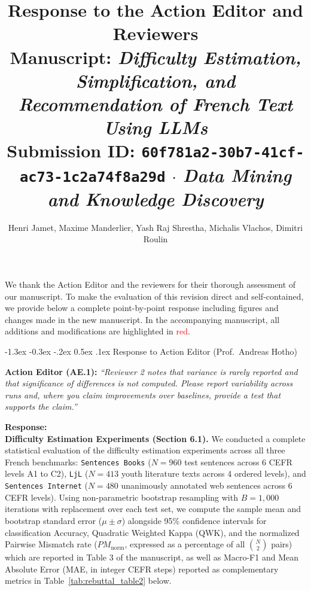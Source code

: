 \documentclass[11pt,a4paper]{article}
\title{\vspace{-1.2cm}\textbf{\large Response to the Action Editor and Reviewers}\\[0.2em]
\normalsize Manuscript: \textit{Difficulty Estimation, Simplification, and Recommendation of French Text Using LLMs}\\
\small Submission ID: \texttt{60f781a2-30b7-41cf-ac73-1c2a74f8a29d} $\cdot$ \textit{Data Mining and Knowledge Discovery}}
\author{\small Henri Jamet, Maxime Manderlier, Yash Raj Shrestha, Michalis Vlachos, Dimitri Roulin}
\date{\vspace{-0.8cm}}
\makeatletter
\renewcommand\section{\@startsection {section}{1}{\z@}%
  {-1.3ex \@plus -0.3ex \@minus -.2ex}%
  {0.5ex \@plus.1ex}%
  {\normalfont\large\bfseries}}
\makeatother
\begin{document}
\maketitle

\medskip
\noindent
We thank the Action Editor and the reviewers for their thorough assessment of our manuscript. To make the evaluation of this revision direct and self-contained, we provide below a complete point-by-point response including figures and changes made in the new manuscript. In the accompanying manuscript, all additions and modifications are highlighted in \textcolor{red}{red}.

\section{Response to Action Editor (Prof.\ Andreas Hotho)}

\begin{reviewbox}
\textbf{Action Editor (AE.1):} \textit{``Reviewer 2 notes that variance is rarely reported and that significance of differences is not computed. Please report variability across runs and, where you claim improvements over baselines, provide a test that supports the claim.''}
\end{reviewbox}

\noindent\textbf{Response:}\\
\noindent\textbf{Difficulty Estimation Experiments (Section 6.1).} We conducted a complete statistical evaluation of the difficulty estimation experiments across all three French benchmarks: \texttt{Sentences Books} ($N = 960$ test sentences across 6 CEFR levels A1 to C2), \texttt{LjL} ($N = 413$ youth literature texts across 4 ordered levels), and \texttt{Sentences Internet} ($N = 480$ unanimously annotated web sentences across 6 CEFR levels). Using non-parametric bootstrap resampling with $B = 1{,}000$ iterations with replacement over each test set, we compute the sample mean and bootstrap standard error ($\mu \pm \sigma$) alongside 95\% confidence intervals for classification Accuracy, Quadratic Weighted Kappa (QWK), and the normalized Pairwise Mismatch rate ($PM_{\text{norm}}$, expressed as a percentage of all $\binom{N}{2}$ pairs) which are reported in Table 3 of the manuscript, as well as Macro-F1 and Mean Absolute Error (MAE, in integer CEFR steps) reported as complementary metrics in Table~\ref{tab:rebuttal_table2} below.
\end{document}
